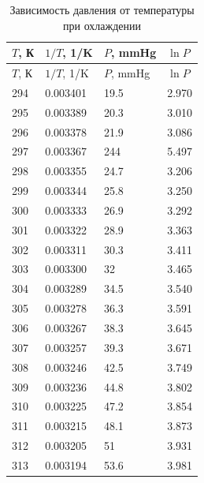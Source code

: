 \documentclass[12pt]{article}
\begin{document}
\begin{longtable}[H]{|l|l|l|l|}
	\caption{Зависимость давления от температуры при охлаждении} 
	
	\\ \hline
	$T$, К & $1/T$, 1/K & $P$, mmHg & $\ln{P}$ \\ \hline
	\endfirsthead
	\hline
	$T$, К & $1/T$, 1/K & $P$, mmHg & $\ln{P}$ \\ \hline
	\endhead
	
294    & 0.003401   & 19.5      & 2.970    \\ \hline
295    & 0.003389   & 20.3      & 3.010    \\ \hline
296    & 0.003378   & 21.9      & 3.086    \\ \hline
297    & 0.003367   & 244       & 5.497    \\ \hline
298    & 0.003355   & 24.7      & 3.206    \\ \hline
299    & 0.003344   & 25.8      & 3.250    \\ \hline
300    & 0.003333   & 26.9      & 3.292    \\ \hline
301    & 0.003322   & 28.9      & 3.363    \\ \hline
302    & 0.003311   & 30.3      & 3.411    \\ \hline
303    & 0.003300   & 32        & 3.465    \\ \hline
304    & 0.003289   & 34.5      & 3.540    \\ \hline
305    & 0.003278   & 36.3      & 3.591    \\ \hline
306    & 0.003267   & 38.3      & 3.645    \\ \hline
307    & 0.003257   & 39.3      & 3.671    \\ \hline
308    & 0.003246   & 42.5      & 3.749    \\ \hline
309    & 0.003236   & 44.8      & 3.802    \\ \hline
310    & 0.003225   & 47.2      & 3.854    \\ \hline
311    & 0.003215   & 48.1      & 3.873    \\ \hline
312    & 0.003205   & 51        & 3.931    \\ \hline
313    & 0.003194   & 53.6      & 3.981    \\ \hline
\end{longtable}
\end{document}
